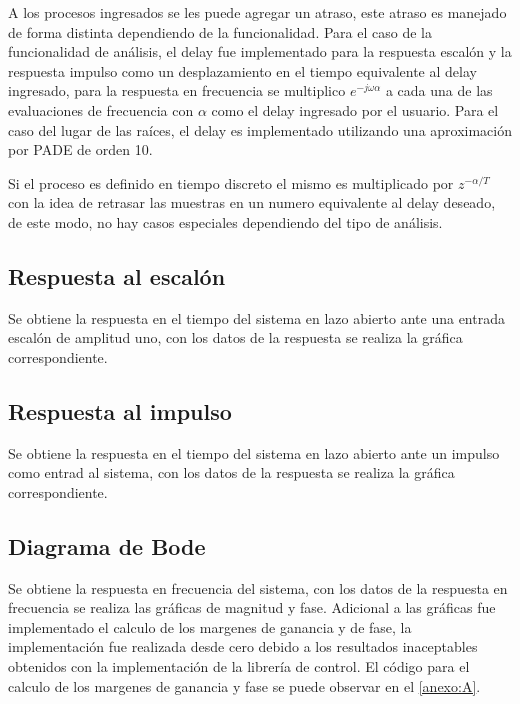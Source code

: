         A los procesos ingresados se les puede agregar un atraso, este atraso es manejado de forma distinta dependiendo de la funcionalidad. Para el caso de la funcionalidad de análisis, el delay fue implementado para la respuesta escalón y la respuesta impulso como un desplazamiento en el tiempo equivalente al delay ingresado, para la respuesta en frecuencia se multiplico $e^{-j\omega \alpha}$ a cada una de las evaluaciones de frecuencia con $\alpha$ como el delay ingresado por el usuario. Para el caso del lugar de las raíces, el delay es implementado utilizando una aproximación por PADE de orden 10.

        Si el proceso es definido en tiempo discreto el mismo es multiplicado por $z^{-\alpha/T}$ con la idea de retrasar las muestras en un numero equivalente al delay deseado, de este modo, no hay casos especiales dependiendo del tipo de análisis.

    \subsection{Respuesta al escalón}
        
        Se obtiene la respuesta en el tiempo del sistema en lazo abierto ante una entrada escalón de amplitud uno, con los datos de la respuesta se realiza la gráfica correspondiente.
    
    \subsection{Respuesta al impulso}
        
        Se obtiene la respuesta en el tiempo del sistema en lazo abierto ante un impulso como entrad al sistema, con los datos de la respuesta se realiza la gráfica correspondiente.

    \subsection{Diagrama de Bode}
        
        Se obtiene la respuesta en frecuencia del sistema, con los datos de la respuesta en frecuencia se realiza las gráficas de magnitud y fase. Adicional a las gráficas fue implementado el calculo de los margenes de ganancia y de fase, la implementación fue realizada desde cero debido a los resultados inaceptables obtenidos con la implementación de la librería de control. El código para el calculo de los margenes de ganancia y fase se puede observar en el \ref{anexo:A}.
    
